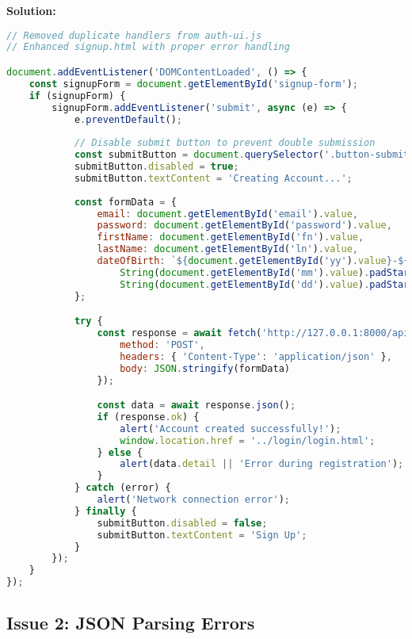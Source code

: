 \documentclass[12pt,a4paper]{article}
\begin{document}
\textbf{Solution:}
\begin{lstlisting}[language=JavaScript, caption=Fixed Signup Handler]
// Removed duplicate handlers from auth-ui.js
// Enhanced signup.html with proper error handling

document.addEventListener('DOMContentLoaded', () => {
    const signupForm = document.getElementById('signup-form');
    if (signupForm) {
        signupForm.addEventListener('submit', async (e) => {
            e.preventDefault();
            
            // Disable submit button to prevent double submission
            const submitButton = document.querySelector('.button-submit');
            submitButton.disabled = true;
            submitButton.textContent = 'Creating Account...';
            
            const formData = {
                email: document.getElementById('email').value,
                password: document.getElementById('password').value,
                firstName: document.getElementById('fn').value,
                lastName: document.getElementById('ln').value,
                dateOfBirth: `${document.getElementById('yy').value}-${
                    String(document.getElementById('mm').value).padStart(2, '0')}-${
                    String(document.getElementById('dd').value).padStart(2, '0')}`
            };

            try {
                const response = await fetch('http://127.0.0.1:8000/api/signup', {
                    method: 'POST',
                    headers: { 'Content-Type': 'application/json' },
                    body: JSON.stringify(formData)
                });

                const data = await response.json();
                if (response.ok) {
                    alert('Account created successfully!');
                    window.location.href = '../login/login.html';
                } else {
                    alert(data.detail || 'Error during registration');
                }
            } catch (error) {
                alert('Network connection error');
            } finally {
                submitButton.disabled = false;
                submitButton.textContent = 'Sign Up';
            }
        });
    }
});
\end{lstlisting}

\subsection{Issue 2: JSON Parsing Errors}
\end{document}
